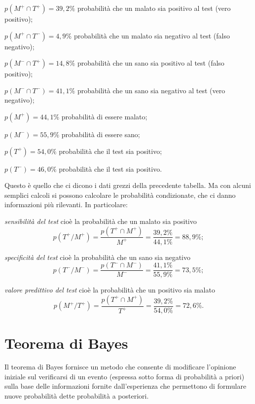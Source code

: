 \begin{exrig}
\begin{esempio}
\begin{description*}
\item  $p(M^{+}\cap T^{+})=39,2\%$ \quad probabilità che un malato sia positivo al test (vero positivo);
\item  $p(M^{+{}}\cap T^{-})=4,9\%$ \quad probabilità che un malato sia negativo al test (falso negativo);
\item  $p(M^{-}\cap T^{+})=14,8\%$ \quad probabilità che un sano sia positivo al test (falso positivo);
\item  $p(M^{-}\cap T^{-})=41,1\%$ \quad probabilità che un sano sia negativo al test (vero negativo);
\item  $p(M^{+})=44,1\%$ \quad probabilità di essere malato;
\item  $p(M^{-{}})=55,9\%$ \quad probabilità di essere sano;
\item  $p(T^{+})=54,0\%$ \quad probabilità che il test sia positivo;
\item  $p(T^{-})=46,0\%$ \quad probabilità che il test sia positivo.
\end{description*}
Questo è quello che ci dicono i dati grezzi della precedente tabella. Ma
con alcuni semplici calcoli si possono calcolare le probabilità
condizionate, che ci danno informazioni più rilevanti. In particolare:
\begin{itemize*}
\item \emph{sensibilità del test} cioè la probabilità che un malato sia positivo  
\[p(T^{+}/M^{+})=\frac{p(T^{+}\cap M^{+})}{M^{+}}=\frac{39,2\%}{44,1\%}=88,9\%;\]

\item \emph{specificità del test} cioè la probabilità che un sano sia negativo 
\[p(T^{-}/M^{-})=\frac{p(T^{-{}}\cap M^{-})}{M^{-}}=\frac{41,1\%}{55,9\%}=73,5\%;\]

\item \emph{valore predittivo del test} cioè la probabilità che un positivo sia malato
\[p(M^{+}/T^{+})=\frac{p(T^{+}\cap M^{+})}{T^{+}}=\frac{39,2\%}{54,0\%}=72,6\%.\]
\end{itemize*}
\end{esempio}
\end{exrig}

\section{Teorema di Bayes}
Il teorema di Bayes fornisce un metodo che consente di modificare
l'opinione iniziale sul verificarsi di un evento (espressa sotto forma
di probabilità a priori) sulla base delle informazioni fornite
dall'esperienza che permettono di formulare nuove probabilità dette
probabilità a posteriori.

